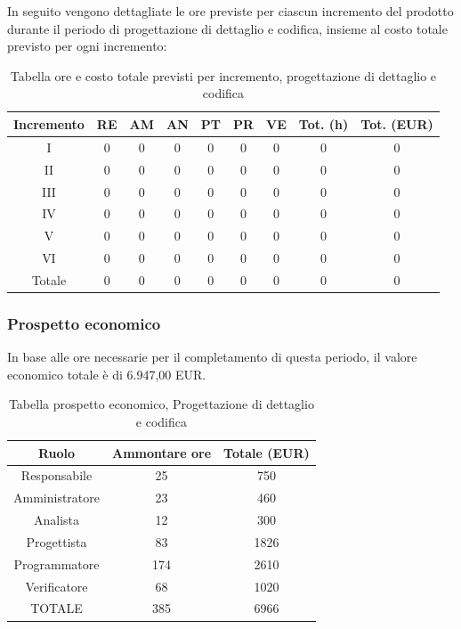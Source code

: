 \FloatBarrier
\noindent In seguito vengono dettagliate le ore previste per ciascun incremento del prodotto durante il periodo di progettazione di dettaglio e codifica, insieme al costo totale previsto per ogni incremento:
\begin{table}[h]
	\caption{Tabella ore e costo totale previsti per incremento, progettazione di dettaglio e codifica}
	\begin{center}
		\begin{tabular}{ |c|c|c|c|c|c|c|c|c|  }
			\hline
			Incremento 		& RE 	& AM 	& AN 	& PT 	& PR 	& VE 	& Tot. (h) & Tot. (EUR) \\
			\hline\hline
			I		& 0 		& 0			& 0 	& 0 	& 0 		& 0 		& 0	 & 0\\
			II		& 0 		& 0 		& 0 	& 0	& 0 		& 0 		& 0	&0\\
			III		& 0 		& 0 		& 0 	& 0	& 0 		& 0 		& 0	&0\\
			IV		& 0 		& 0 		& 0 	& 0 	& 0 		& 0 		& 0 	&0\\
			V		& 0 		& 0 		& 0 	& 0		& 0 		& 0	 		& 0			&0\\
			VI		& 0 		& 0 		& 0 	& 0 	& 0 		& 0 		& 0			&0\\
			\hline\hline
			Totale		& 0		& 0		& 0 	& 0	 	& 0 	& 0 	& 0 	&0\\
			\hline
		\end{tabular}
	\end{center}
\end{table}

\subsubsection{Prospetto economico}
In base alle ore necessarie per il completamento di questa periodo, il valore economico totale è di 6.947,00 EUR.
\begin{table}[h]
\caption{Tabella prospetto economico, Progettazione di dettaglio e codifica}
\begin{center}
\begin{tabular}{ |c|c|c|  }
 \hline
 Ruolo 		& Ammontare ore 	& Totale (EUR)\\
 	\hline
 \hline
 	Responsabile	& 25 		& 750\\
	Amministratore	& 23		& 460\\
	Analista		& 12 	& 300\\
	Progettista		& 83		& 1826\\
	Programmatore	& 174		& 2610 \\
	Verificatore	& 68 	& 1020\\
 \hline\hline
 TOTALE		& 385		& 6966\\
  \hline
\end{tabular}
\end{center}
\end{table}
\newpage
